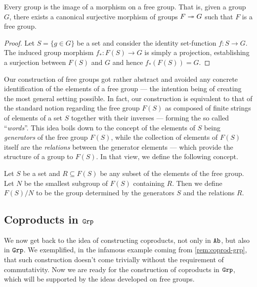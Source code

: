 \begin{proposition}
\label{prop:free-group-factorization}
Every group is the image of a morphism on a free group. That is, given a group
\(G\), there exists a canonical surjective morphism of groups \(F \twoheadrightarrow G\)
such that \(F\) is a free group.
\end{proposition}

\begin{proof}
Let \(S = \{g \in G\}\) be a set and consider the identity set-function \(f: S \to
G\). The induced group morphism \(f_{*}: F(S) \to G\) is simply a projection,
establishing a surjection between \(F(S)\) and \(G\) and hence \(f_{*}(F(S)) =
G\).
\end{proof}

Our construction of free groups got rather abstract and avoided any concrete
identification of the elements of a free group --- the intention being of
creating the most general setting possible. In fact, our construction is
equivalent to that of the standard notion regarding the free group \(F(S)\) as
composed of finite strings of elements of a set \(S\) together with their
inverses --- forming the so called ``\emph{words}''. This idea boils down to the
concept of the elements of \(S\) being \emph{generators} of the free group
\(F(S)\), while the collection of elements of \(F(S)\) itself are the
\emph{relations} between the generator elements --- which provide the structure
of a group to \(F(S)\). In that view, we define the following concept.

\begin{definition}
\label{def:grp-determined-generators-relations}
Let \(S\) be a set and \(R \subseteq F(S)\) be any subset of the elements of the
free group. Let \(N\) be the smallest subgroup of \(F(S)\) containing
\(R\). Then we define \(F(S)/N\) to be the group determined by the generators
\(S\) and the relations \(R\).
\end{definition}

\subsection{Coproducts in \texorpdfstring{\({\texttt{Grp}}\)}{Grp}}

We now get back to the idea of constructing coproducts, not only in \({\texttt{Ab}}\), but
also in \({\texttt{Grp}}\). We exemplified, in the infamous example coming from
\cref{rem:coprod-grp}, that such construction doesn't come trivially without
the requirement of commutativity. Now we are ready for the construction of
coproducts in \({\texttt{Grp}}\), which will be supported by the ideas developed on free
groups.

